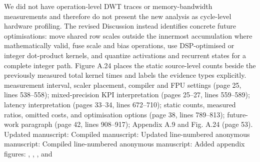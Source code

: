 {}We did not have operation-level DWT traces or memory-bandwidth measurements and therefore do not present the new analysis as cycle-level hardware profiling. The revised Discussion instead identifies concrete future optimisations: move shared row scales outside the innermost accumulation where mathematically valid, fuse scale and bias operations, use DSP-optimised or integer dot-product kernels, and quantize activations and recurrent states for a complete integer path. Figure A.24 places the static source-level counts beside the previously measured total kernel times and labels the evidence types explicitly.\markdownRendererParagraphSeparator
{} measurement interval, scaler placement, compiler and FPU settings (page 25, lines 538--558); mixed-precision KPI interpretation (pages 25--27, lines 559--589); latency interpretation (pages 33--34, lines 672--710); static counts, measured ratios, omitted costs, and optimisation options (page 38, lines 789--813); future-work paragraph (page 42, lines 908--917); Appendix A.9 and Fig. A.24 (page 53).\markdownRendererInterblockSeparator
{}
\markdownRendererSectionEnd \markdownRendererSectionBegin
{}\markdownRendererInterblockSeparator
{}\markdownRendererUlBeginTight
\markdownRendererUlItem Updated manuscript: \markdownRendererUlItemEnd 
\markdownRendererUlItem Compiled manuscript: \markdownRendererUlItemEnd 
\markdownRendererUlItem Updated line-numbered anonymous manuscript: \markdownRendererUlItemEnd 
\markdownRendererUlItem Compiled line-numbered anonymous manuscript: \markdownRendererUlItemEnd 
\markdownRendererUlItem Added appendix figures: , , , and \markdownRendererUlItemEnd 
